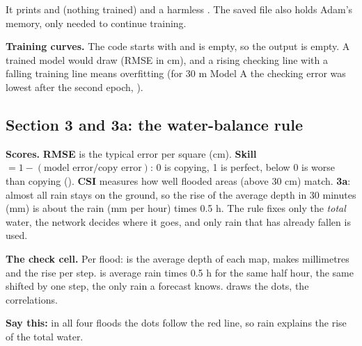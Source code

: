 It prints  and  (nothing trained) and a harmless . The saved file also holds Adam's memory, only needed to continue training.

\textbf{Training curves.} The code starts with  and  is empty, so the output is empty. A trained model would draw  (RMSE in cm), and a rising checking line with a falling training line means overfitting (for 30 m Model A the checking error was lowest after the second epoch, ).


\subsection{Section 3 and 3a: the water-balance rule}

\textbf{Scores.} \textbf{RMSE} is the typical error per square (cm). \textbf{Skill} $= 1 - (\text{model error}/\text{copy error})$: 0 is copying, 1 is perfect, below 0 is worse than copying (). \textbf{CSI} measures how well flooded areas (above 30 cm) match. \textbf{3a}: almost all rain stays on the ground, so the rise of the average depth in 30 minutes (mm) is about the rain (mm per hour) times 0.5 h. The rule fixes only the \emph{total} water, the network decides where it goes, and only rain that has already fallen is used.

\textbf{The check cell.} Per flood:  is the average depth of each map,  makes millimetres and  the rise per step.  is average rain times 0.5 h for the same half hour,  the same shifted by one step, the only rain a forecast knows.  draws the dots,  the correlations. 

\textbf{Say this:} in all four floods the dots follow the red line, so rain explains the rise of the total water. 

